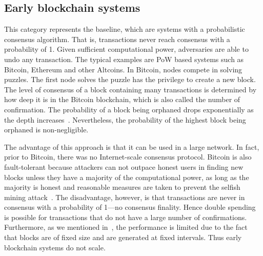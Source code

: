 \subsection{Early blockchain systems}
This category represents the baseline,
which are systems with a probabilistic consensus algorithm.
That is, transactions never reach consensus with a probability of 1.
Given sufficient computational power, adversaries are able to undo any transaction.
The typical examples are PoW based systems such as Bitcoin, Ethereum and other Altcoins.
In Bitcoin, nodes compete in solving puzzles.
The first node solves the puzzle has the privilege to create a new block.
The level of consensus of a block containing many transactions is determined by how deep it is in the Bitcoin blockchain,
which is also called the number of confirmation.
The probability of a block being orphaned drops exponentially as the depth increases~\cite{bitcoin}.
Nevertheless, the probability of the highest block being orphaned is non-negligible.

The advantage of this approach is that it can be used in a large network.
In fact, prior to Bitcoin, there was no Internet-scale consensus protocol.
Bitcoin is also fault-tolerant because attackers can not outpace honest users in finding new blocks unless they have a majority of the computational power,
as long as the majority is honest and reasonable measures are taken to prevent the selfish mining attack~\cite{eyal2014majority}.
The disadvantage, however, is that transactions are never in consensus with a probability of 1---no consensus finality.
Hence double spending is possible for transactions that do not have a large number of confirmations.
Furthermore, as we mentioned in~,
the performance is limited due to the fact that blocks are of fixed size and are generated at fixed intervals.
Thus early blockchain systems do not scale.


